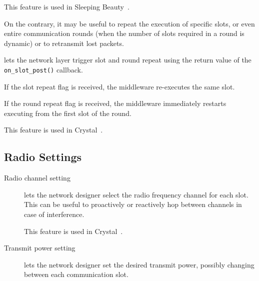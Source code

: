 \begin{description}
	This feature is used \eg in Sleeping Beauty~\cite{sarkar2016Sleeping}.

	\item [Repeating slots or rounds]
	On the contrary, it may be useful to repeat the execution of specific slots, or even entire communication rounds (\eg when the number of slots required in a round is dynamic) or to retransmit lost packets.

	\baloo lets the network layer trigger slot and round repeat using the return value of the \texttt{on\_slot\_post()} callback.
	\begin{subitemize}

		\item
		If the slot repeat flag is received, the middleware re-executes the same slot.

		\item
		If the round repeat flag is received, the middleware immediately restarts executing from the first slot of the round.

	\end{subitemize}

	This feature is used \eg in Crystal~\cite{istomin2018Interferenceresilient}.


\end{description}

\subsection{Radio Settings}
\label{subsec:adv_radio}


\begin{description}
	\item [Radio channel setting]
	\baloo lets the network designer select the radio frequency channel for each slot. This can be useful to proactively or reactively hop between channels in case of interference.

	This feature is used \eg in Crystal~\cite{istomin2018Interferenceresilient}.

	\item [Transmit power setting]
	\baloo lets the network designer set the desired transmit power, possibly changing between each communication slot.

\end{description}
